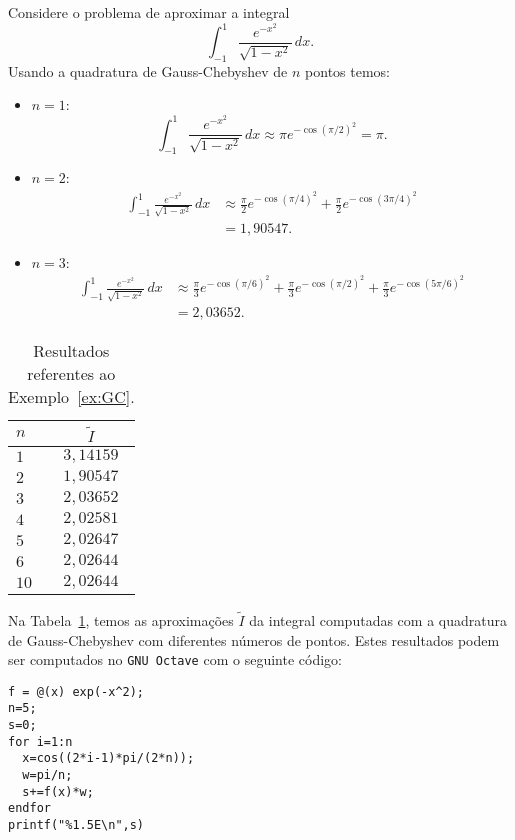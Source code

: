 \begin{ex}\label{ex:GC}
  Considere o problema de aproximar a integral
  \begin{equation}
    \int_{-1}^1 \frac{e^{-x^2}}{\sqrt{1-x^2}}\,dx.
  \end{equation}
Usando a quadratura de Gauss-Chebyshev de $n$ pontos temos:
\begin{itemize}
\item $n=1$:
  \begin{equation}
  \int_{-1}^1 \frac{e^{-x^2}}{\sqrt{1-x^2}}\,dx \approx \pi e^{-\cos(\pi/2)^2} = \pi.
\end{equation}
\item $n=2$:
  \begin{align}
  \int_{-1}^1 \frac{e^{-x^2}}{\sqrt{1-x^2}}\,dx &\approx \frac{\pi}{2} e^{-\cos(\pi/4)^2} + \frac{\pi}{2} e^{-\cos(3\pi/4)^2}  \\
    &= 1,90547.
\end{align}
\item $n=3$:
  \begin{align}
  \int_{-1}^1 \frac{e^{-x^2}}{\sqrt{1-x^2}}\,dx &\approx \frac{\pi}{3} e^{-\cos(\pi/6)^2} + \frac{\pi}{3} e^{-\cos(\pi/2)^2} + \frac{\pi}{3} e^{-\cos(5\pi/6)^2}  \\
    &= 2,03652.
\end{align}
\end{itemize}

\begin{table}[h!]
  \centering
  \begin{tabular}{lc}
    $n$ & $\tilde{I}$\\\hline
    $1$ & $3,14159$\\
    $2$ & $1,90547$\\
    $3$ & $2,03652$\\
    $4$ & $2,02581$\\
    $5$ & $2,02647$\\
    $6$ & $2,02644$\\
    $10$ & $2,02644$\\\hline
  \end{tabular}
  \caption{Resultados referentes ao Exemplo~\ref{ex:GC}.}
  \label{tab:ex_GC}
\end{table}

Na Tabela~\ref{tab:ex_GC}, temos as aproximações $\tilde{I}$ da integral computadas com a quadratura de Gauss-Chebyshev  com diferentes números de pontos.
\ifisoctave
Estes resultados podem ser computados no \verb+GNU Octave+ com o seguinte código:
\begin{verbatim}
f = @(x) exp(-x^2);
n=5;
s=0;
for i=1:n
  x=cos((2*i-1)*pi/(2*n));
  w=pi/n;
  s+=f(x)*w;
endfor
printf("%1.5E\n",s)
\end{verbatim}
\fi
\end{ex}

